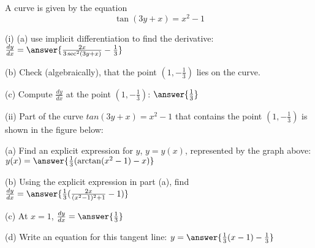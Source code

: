 \documentclass{ximera}
\begin{document}
\begin{exercise}
A curve is given by the equation $$\tan(3y+x)=x^2-1$$

(i) (a) use implicit differentiation to find the derivative: $\frac{dy}{dx}=\answer{\frac{2x}{3\sec^2(3y+x)}-\frac{1}{3}}$

(b) Check (algebraically), that the point $(1,-\frac{1}{3})$ lies on the curve.

(c) Compute $\frac{dy}{dx}$ at the point $(1,-\frac{1}{3})$: $\answer{\frac{1}{3}}$
 
(ii) Part of the curve $tan(3y+x)=x^2-1$ that contains the point $(1,-\frac{1}{3})$ is shown in the figure below:

\begin{image}
\end{image}

(a) Find an explicit expression for $y$, $y=y(x)$, represented by the graph above: $y(x)=\answer{\frac{1}{3}(\arctan(x^2-1)-x)}$

(b) Using the explicit expression in part (a), find $\frac{dy}{dx}=\answer{\frac{1}{3}(\frac{2x}{(x^2-1)^2+1}-1)}$

(c) At $x=1$, $\frac{dy}{dx}=\answer{\frac{1}{3}}$



(d) Write an equation for this tangent line: $y=\answer{\frac{1}{3}(x-1)-\frac{1}{3}}$
\end{exercise}
\end{document}
